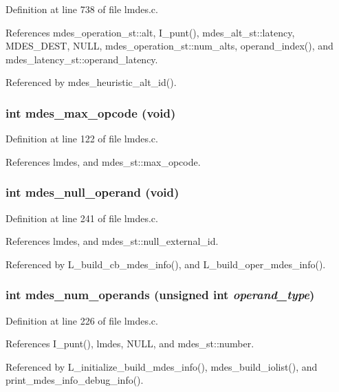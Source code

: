 Definition at line 738 of file lmdes.c.

References mdes\_\-operation\_\-st::alt, I\_\-punt(), mdes\_\-alt\_\-st::latency, MDES\_\-DEST, NULL, mdes\_\-operation\_\-st::num\_\-alts, operand\_\-index(), and mdes\_\-latency\_\-st::operand\_\-latency.

Referenced by mdes\_\-heuristic\_\-alt\_\-id().
\subsubsection{\setlength{\rightskip}{0pt plus 5cm}int mdes\_\-max\_\-opcode (void)}\label{lmdes_8h_87c24ac7a003ff4ced90a725d84644f0}




Definition at line 122 of file lmdes.c.

References lmdes, and mdes\_\-st::max\_\-opcode.
\subsubsection{\setlength{\rightskip}{0pt plus 5cm}int mdes\_\-null\_\-operand (void)}\label{lmdes_8h_57537f171f1012dd9f07c719b258cec3}




Definition at line 241 of file lmdes.c.

References lmdes, and mdes\_\-st::null\_\-external\_\-id.

Referenced by L\_\-build\_\-cb\_\-mdes\_\-info(), and L\_\-build\_\-oper\_\-mdes\_\-info().
\subsubsection{\setlength{\rightskip}{0pt plus 5cm}int mdes\_\-num\_\-operands (unsigned int {\em operand\_\-type})}\label{lmdes_8h_16c4bed2c322b1d117acf2ad16a06f1c}




Definition at line 226 of file lmdes.c.

References I\_\-punt(), lmdes, NULL, and mdes\_\-st::number.

Referenced by L\_\-initialize\_\-build\_\-mdes\_\-info(), mdes\_\-build\_\-iolist(), and print\_\-mdes\_\-info\_\-debug\_\-info().
